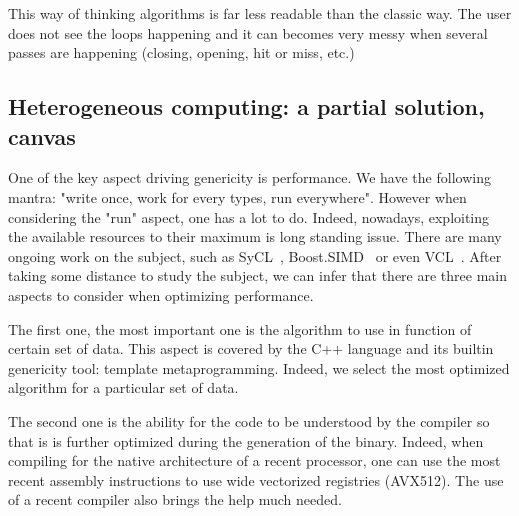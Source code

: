 This way of thinking algorithms is far less readable than the classic way. The user does not see the loops happening and
it can becomes very messy when several passes are happening (closing, opening, hit or miss, etc.)

\vspace{1cm}


\subsection{Heterogeneous computing: a partial solution, canvas}
\label{sec.hc.canvas}

One of the key aspect driving genericity is performance. We have the following mantra: "write once, work for every
types, run everywhere". However when considering the "run" aspect, one has a lot to do. Indeed, nowadays, exploiting the
available resources to their maximum is long standing issue. There are many ongoing work on the subject, such as
SyCL~\cite{brown.2019.heterogeneous,wong.2019.heterogeneous}, Boost.SIMD~\cite{esterie.2014.boostsimd} or even
VCL~\cite{fog.2013.vcl}. After taking some distance to study the subject, we can infer that there are three main aspects
to consider when optimizing performance.

The first one, the most important one is the algorithm to use in function of certain set of data. This aspect is covered
by the C++ language and its builtin genericity tool: template metaprogramming. Indeed, we select the most optimized
algorithm for a particular set of data.

The second one is the ability for the code to be understood by the compiler so that is is further optimized during the
generation of the binary. Indeed, when compiling for the native architecture of a recent processor, one can use the most
recent assembly instructions to use wide vectorized registries (AVX512). The use of a recent compiler also brings the
help much needed.


